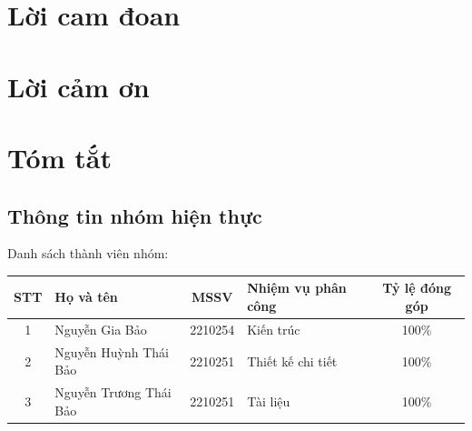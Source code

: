 \documentclass[12pt, a4paper]{report}
\theoremstyle{definition}
\begin{document}

\chapter*{Lời cam đoan}

\thispagestyle{empty}


\chapter*{Lời cảm ơn}

\thispagestyle{empty}

\chapter*{Tóm tắt}

\thispagestyle{empty}


\newpage
\section*{Thông tin nhóm hiện thực}

Danh sách thành viên nhóm:

\begin{table}[H]
    \centering
    \renewcommand{\arraystretch}{1.6} 
    \begin{tabularx}{\textwidth}{|c|l|c|>{\RaggedRight\arraybackslash}X|c|}
        \hline
        \textbf{STT} & \textbf{Họ và tên} & \textbf{MSSV} & \textbf{Nhiệm vụ phân công} & \textbf{Tỷ lệ đóng góp} \\ \hline
        1 & Nguyễn Gia Bảo & 2210254 & Kiến trúc & 100\% \\ \hline
        2 & Nguyễn Huỳnh Thái Bảo & 2210251 & Thiết kế chi tiết & 100\% \\ \hline
        3 & Nguyễn Trương Thái Bảo & 2210251 & Tài liệu & 100\% \\ \hline
    \end{tabularx}
\end{table}



\newpage

\tableofcontents
\thispagestyle{empty}






\listoftables
\thispagestyle{empty}

\listoffigures
\thispagestyle{empty}
\end{document}
